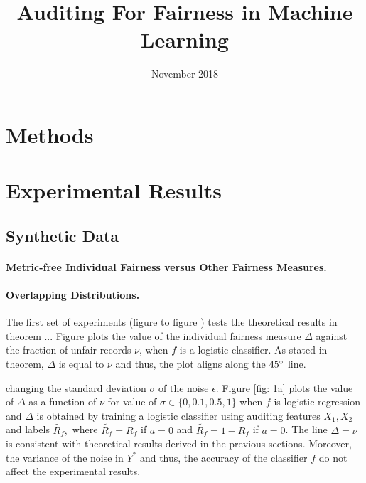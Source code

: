\documentclass{article}
\title{Auditing For Fairness in Machine Learning}
\author{}
\date{November 2018}
\begin{document}
\maketitle

\section{Methods}


\section{Experimental Results}
\subsection{Synthetic Data}

\paragraph{Metric-free Individual Fairness versus Other Fairness Measures.}

\paragraph{Overlapping Distributions.}
The first set of experiments (figure to figure ) tests the theoretical results in theorem ... Figure plots the value of the individual fairness measure $\Delta$ against the fraction of unfair records $\nu$, when $f$ is a logistic classifier. As stated in theorem, $\Delta$ is equal to $\nu$ and thus, the plot aligns along the $45\degree$ line. 

changing the standard deviation $\sigma$ of the noise $\epsilon$. Figure \ref{fig: 1a} plots the value of $\Delta$ as a function of $\nu$ for value of $\sigma\in \{0, 0.1, 0.5, 1\}$ when $f$ is logistic regression and $\Delta$ is obtained by training a logistic classifier using auditing features $X_{1}, X_{2}$ and labels $\tilde{R_{f}},$ where  $\tilde{R_{f}}=R_{f}$ if $a=0$ and  $\tilde{R_{f}}=1 -R_{f}$ if $a=0$. The line $\Delta=\nu$ is consistent with theoretical results derived in the previous sections. Moreover, the variance of the noise in $Y^{*}$ and thus, the accuracy of the classifier $f$ do not affect the experimental results.
\end{document}

